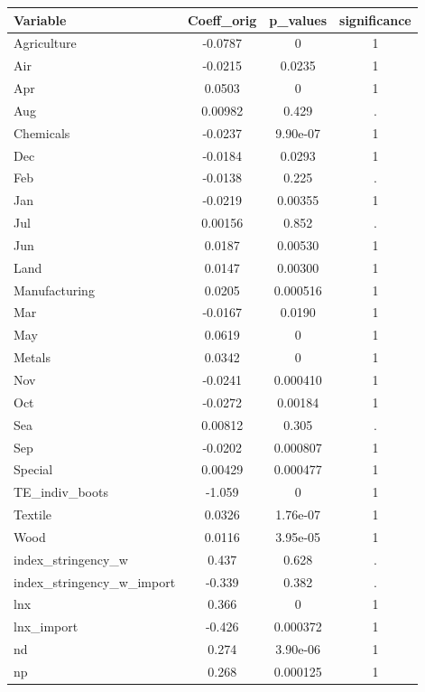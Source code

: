 \documentclass[]{article}
\begin{document}
\begin{tabular}{lccc} \hline
Variable & Coeff\_orig & p\_values & significance \\ \hline
Agriculture & -0.0787 & 0 & 1 \\
Air & -0.0215 & 0.0235 & 1 \\
Apr & 0.0503 & 0 & 1 \\
Aug & 0.00982 & 0.429 & . \\
Chemicals & -0.0237 & 9.90e-07 & 1 \\
Dec & -0.0184 & 0.0293 & 1 \\
Feb & -0.0138 & 0.225 & . \\
Jan & -0.0219 & 0.00355 & 1 \\
Jul & 0.00156 & 0.852 & . \\
Jun & 0.0187 & 0.00530 & 1 \\
Land & 0.0147 & 0.00300 & 1 \\
Manufacturing & 0.0205 & 0.000516 & 1 \\
Mar & -0.0167 & 0.0190 & 1 \\
May & 0.0619 & 0 & 1 \\
Metals & 0.0342 & 0 & 1 \\
Nov & -0.0241 & 0.000410 & 1 \\
Oct & -0.0272 & 0.00184 & 1 \\
Sea & 0.00812 & 0.305 & . \\
Sep & -0.0202 & 0.000807 & 1 \\
Special & 0.00429 & 0.000477 & 1 \\
TE\_indiv\_boots & -1.059 & 0 & 1 \\
Textile & 0.0326 & 1.76e-07 & 1 \\
Wood & 0.0116 & 3.95e-05 & 1 \\
index\_stringency\_w & 0.437 & 0.628 & . \\
index\_stringency\_w\_import & -0.339 & 0.382 & . \\
lnx & 0.366 & 0 & 1 \\
lnx\_import & -0.426 & 0.000372 & 1 \\
nd & 0.274 & 3.90e-06 & 1 \\
 np & 0.268 & 0.000125 & 1 \\ \hline
\end{tabular}
\end{document}
